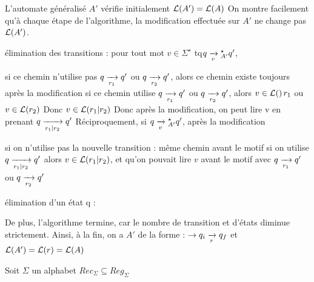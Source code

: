 \documentclass[a4paper,french,bookmarks]{book}
\begin{document}
    \begin{nproof}
        \begin{enumerate}
            \itt L'automate généralisé $A'$ vérifie initialement $\mathcal{L}\!\left(A'\right) = \mathcal{L}\!\left(A\right)$
            \itt On montre facilement qu'à chaque étape de l'algorithme, la modification effectuée sur $A'$ ne change pas $\mathcal{L}\!\left(A'\right)$.
            \begin{enumerate}
                \itt élimination des transitions : pour tout mot $v \in \Sigma^\star$ tq$q \lima{v}{}_{A'}^\star q'$, 
                \begin{enumerate}
                    \itt si ce chemin n'utilise pas $q \lima{r_1}{} q'$ ou $q \lima{r_2}{}q'$, alors ce chemin existe toujours après la modification
                    \itt si ce chemin utilise $q \lima{r_1}{} q'$ ou $q \lima{r_2}{}q'$, alors $v \in \mathcal{L}\!\left(\right)r_1$ ou $v \in \mathcal{L}\!\left(r_2\right)$
                    Donc $v \in \mathcal{L}\!\left(r_1 \vert r_2\right)$
                    Donc après la modification, on peut lire v en prenant $q \lima{r_1 \vert r_2}{} q'$
                    \itt Réciproquement, si $q \lima{v}{}_{A'}^\star q'$, après la modification
                    \begin{enumerate}
                        \itt si on n'utilise pas la nouvelle transition : même chemin avant le motif
                        \itt si on utilise $q \lima{r_1 \vert r_2}{} q'$ alors $v \in \mathcal{L}\!\left(r_1 \vert r_2\right)$, et qu'on pouvait lire $v$ avant le motif avec $q \lima{r_1}{} q'$ ou $q \lima{r_2}{} q'$
                    \end{enumerate}
                \end{enumerate}
                \itt élimination d'un état q :
            \end{enumerate}
            \itt De plus, l'algorithme termine, car le nombre de transition et d'états diminue strictement. Ainsi, à la fin, on a  $A'$ de la forme : $\to q_i \lima{r}{} q_f$ et $\mathcal{L}\!\left(A'\right) = \mathcal{L}\!\left(r\right) = \mathcal{L}\!\left(A\right)$
        \end{enumerate}
    
    \end{nproof}
    
    \begin{corollary}{}{}
        Soit $\Sigma$ un alphabet 
        $Rec_\Sigma \subseteq Reg_\Sigma$
    \end{corollary}
    
\end{document}
